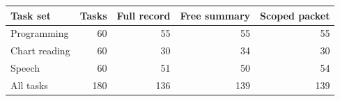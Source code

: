 \begin{tabular}{lrrrr}
\toprule
Task set & Tasks & Full record & Free summary & Scoped packet \\
\midrule
Programming & 60 & 55 & 55 & 55 \\
Chart reading & 60 & 30 & 34 & 30 \\
Speech & 60 & 51 & 50 & 54 \\
All tasks & 180 & 136 & 139 & 139 \\
\bottomrule
\end{tabular}
